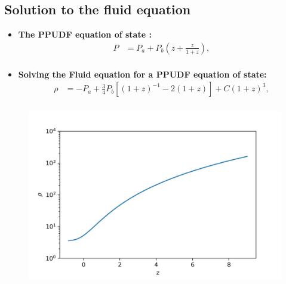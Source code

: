 \documentclass{beamer}
\newcommand{\brac}[1]{\left(#1\right)}
\newcommand{\bracc}[1]{\left[#1\right]}
\begin{document}
\subsection{Solution to the fluid equation}
{
\begin{frame}
\begin{itemize}
\frametitle{\insertsectionhead}
\fontsize{7pt}{7.2}\selectfont
\item \textbf{The PPUDF equation of state \citep{wang2017new}:}
\begin{equation}\label{eq:UDFEoS}
\begin{split}
P &= P_{a}+P_{b}\brac{z+\frac{z}{1+z}},         \\
\end{split}
\end{equation}
\item \textbf{Solving the Fluid equation for a PPUDF equation of state:}
\begin{equation}\label{eq:UDFFluidSolZ}
\begin{split}
\rho&= -P_{a}+\frac{3}{4}P_{b}\bracc{\brac{1+z}^{-1}-2\brac{1+z}}+C\brac{1+z}^{3}, \\
\end{split}
\end{equation}

\end{itemize}
\begin{figure}[h]
\centering
\includegraphics[scale=0.45]{Images/UDF_rho.jpg}
\label{fig:UDFRho}
\end{figure}
\end{frame}

}
\end{document}
